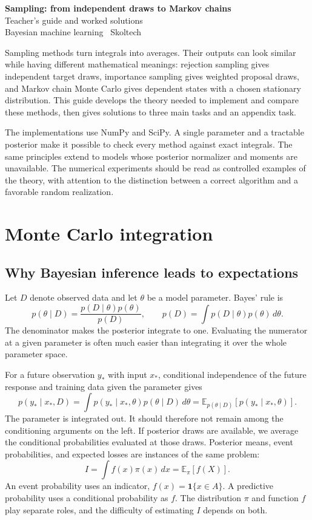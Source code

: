 \documentclass[11pt,a4paper]{article}
\newcommand{\E}{\mathbb E}
\newcommand{\ind}{\mathbf 1}
\begin{document}
\begin{center}
  {\LARGE\bfseries Sampling: from independent draws to Markov chains}\\[6pt]
  {\large Teacher's guide and worked solutions}\\[3pt]
  Bayesian machine learning \textbar\ Skoltech
\end{center}

Sampling methods turn integrals into averages. Their outputs can look similar
while having different mathematical meanings: rejection sampling gives
independent target draws, importance sampling gives weighted proposal draws,
and Markov chain Monte Carlo gives dependent states with a chosen stationary
distribution. This guide develops the theory needed to implement and compare
these methods, then gives solutions to three main tasks and an appendix task.

The implementations use NumPy and SciPy. A single parameter and a tractable
posterior make it possible to check every method against exact integrals.
The same principles extend to models whose posterior normalizer and moments
are unavailable. The numerical experiments should be read as controlled
examples of the theory, with attention to the distinction between a correct
algorithm and a favorable random realization.

\section{Monte Carlo integration}
\subsection{Why Bayesian inference leads to expectations}
Let $D$ denote observed data and let $\theta$ be a model parameter. Bayes' rule is
\[
 p(\theta\mid D)=\frac{p(D\mid\theta)p(\theta)}{p(D)},\qquad
 p(D)=\int p(D\mid\theta)p(\theta)\,d\theta.
\]
The denominator makes the posterior integrate to one. Evaluating the numerator
at a given parameter is often much easier than integrating it over the whole
parameter space.

For a future observation $y_*$ with input $x_*$, conditional independence of
the future response and training data given the parameter gives
\[
 p(y_*\mid x_*,D)
 =\int p(y_*\mid x_*,\theta)p(\theta\mid D)\,d\theta
 =\E_{p(\theta\mid D)}[p(y_*\mid x_*,\theta)].
\]
The parameter is integrated out. It should therefore not remain among the
conditioning arguments on the left. If posterior draws are available, we
average the conditional probabilities evaluated at those draws. Posterior
means, event probabilities, and expected losses are instances of the same
problem:
\[
 I=\int f(x)\pi(x)\,dx=\E_\pi[f(X)].
\]
An event probability uses an indicator, $f(x)=\ind\{x\in A\}$. A predictive
probability uses a conditional probability as $f$. The distribution $\pi$ and
function $f$ play separate roles, and the difficulty of estimating $I$ depends
on both.
\end{document}
